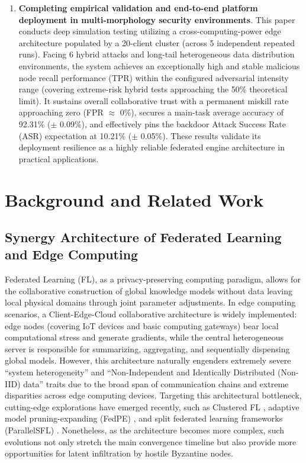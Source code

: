 \documentclass[runningheads]{llncs}
\begin{document}
\begin{enumerate}
    \item \textbf{Completing empirical validation and end-to-end platform deployment in multi-morphology security environments}. This paper conducts deep simulation testing utilizing a cross-computing-power edge architecture populated by a 20-client cluster (across 5 independent repeated runs). Facing 6 hybrid attacks and long-tail heterogeneous data distribution environments, the system achieves an exceptionally high and stable malicious node recall performance (TPR) within the configured adversarial intensity range (covering extreme-risk hybrid tests approaching the 50\% theoretical limit). It sustains overall collaborative trust with a permanent miskill rate approaching zero (FPR $\approx$ 0\%), secures a main-task average accuracy of 92.31\% ($\pm$ 0.09\%), and effectively pins the backdoor Attack Success Rate (ASR) expectation at 10.21\% ($\pm$ 0.05\%). These results validate its deployment resilience as a highly reliable federated engine architecture in practical applications.
\end{enumerate}

\section{Background and Related Work}

\subsection{Synergy Architecture of Federated Learning and Edge Computing}
Federated Learning (FL), as a privacy-preserving computing paradigm, allows for the collaborative construction of global knowledge models without data leaving local physical domains through joint parameter adjustments. In edge computing scenarios, a Client-Edge-Cloud collaborative architecture is widely implemented: edge nodes (covering IoT devices and basic computing gateways) bear local computational stress and generate gradients, while the central heterogeneous server is responsible for summarizing, aggregating, and sequentially dispensing global models. However, this architecture naturally engenders extremely severe ``system heterogeneity'' and ``Non-Independent and Identically Distributed (Non-IID) data'' traits due to the broad span of communication chains and extreme disparities across edge computing devices. Targeting this architectural bottleneck, cutting-edge explorations have emerged recently, such as Clustered FL \cite{r9_clustered}, adaptive model pruning-expanding (FedPE) \cite{fedpe}, and split federated learning frameworks (ParallelSFL) \cite{parallelsfl}. Nonetheless, as the architecture becomes more complex, such evolutions not only stretch the main convergence timeline but also provide more opportunities for latent infiltration by hostile Byzantine nodes.
\end{document}
